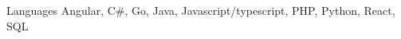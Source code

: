 
\begin{cvskills}

  \cvskill
    {Languages}
    {Angular, C\#, Go, Java, Javascript/typescript, PHP, Python, React, SQL}

\end{cvskills}

